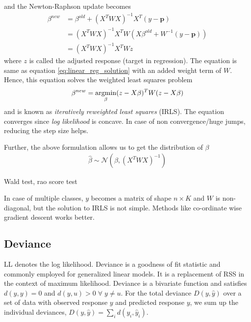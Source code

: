 \documentclass[../statistical_learning_notes.tex]{subfiles}
\begin{document}
    and the Newton-Raphson update becomes
    \begin{align*}
        \beta^{new} &= \beta^{old} + (X^{T}WX)^{-1} X^{T}(y - \mathbf{p})\\
        &= (X^{T}WX)^{-1} X^{T}W(X\beta^{old} + W^{-1}(y - \mathbf{p}))\\
        &= (X^{T}WX)^{-1} X^{T}Wz
    \end{align*}
    where $z$ is called the adjusted response (target in regression). The equation is same as equation \eqref{eq:linear_reg_solution} with an added weight term of $W$. Hence, this equation solves the weighted least squares problem
    \begin{align*}
        \beta^{new} = \operatorname*{argmin}_{\beta} (z - X\beta)^{T}W(z - X\beta)
    \end{align*}
    and is known as \emph{iteratively reweighted least squares} (IRLS). The equation converges since \emph{log likelihood} is concave. In case of non convergence/huge jumps, reducing the step size helps.\newline

    Further, the above formulation allows us to get the distribution of $\beta$
    \begin{align*}
        \hat{\beta} \sim \mathcal{N}(\beta, (X^{T}WX)^{-1})
    \end{align*}

    Wald test, rao score test\newline

    In case of multiple classes, $y$ becomes a matrix of shape $n \times K$ and $W$ is non-diagonal, but the solution to IRLS is not simple. Methods like co-ordinate wise gradient descent works better.\newline


    \subsection{Deviance}
    LL denotes the log likelihood.\newline
    Deviance is a goodness of fit statistic and commonly employed for generalized linear models. It is a replacement of RSS in the context of maximum likelihood. Deviance is a bivariate function and satisfies $d(y,y) = 0$ and $d(y, u) > 0 \; \forall \; y \neq u$. For the total deviance $D(y, \hat{y})$ over a set of data with observed response $y$ and predicted response $y$, we sum up the individual deviances, $D(y, \hat{y}) = \sum_{i} d(y_{i}, \hat{y}_{i})$.\newline
\end{document}

